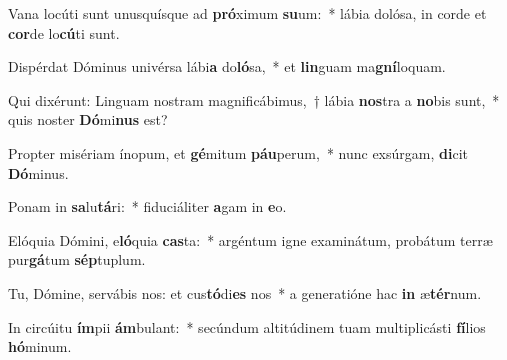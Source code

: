 \item Vana locúti sunt unusquísque ad \textbf{pró}ximum \textbf{su}um:~* lábia dolósa, in corde et \textbf{cor}de lo\textbf{cú}ti sunt.
\item Dispérdat Dóminus univérsa lábi\textbf{a} do\textbf{ló}sa,~* et \textbf{lin}guam ma\textbf{gní}loquam.
\item Qui dixérunt: Linguam nostram magnificábimus,~† lábia \textbf{nos}tra a \textbf{no}bis sunt,~* quis noster \textbf{Dó}mi\textbf{nus} est?
\item Propter misériam ínopum, et \textbf{gé}mitum \textbf{páu}perum,~* nunc exsúrgam, \textbf{di}cit \textbf{Dó}minus.
\item Ponam in \textbf{sa}lu\textbf{tá}ri:~* fiduciáliter \textbf{a}gam in \textbf{e}o.
\item Elóquia Dómini, e\textbf{ló}quia \textbf{cas}ta:~* argéntum igne examinátum, probátum terræ pur\textbf{gá}tum \textbf{sép}tuplum.
\item Tu, Dómine, servábis nos: et cus\textbf{tó}di\textbf{es} nos~* a generatióne hac \textbf{in} æ\textbf{tér}num.
\item In circúitu \textbf{ím}pii \textbf{ám}bulant:~* secúndum altitúdinem tuam multiplicásti \textbf{fí}lios \textbf{hó}minum.
